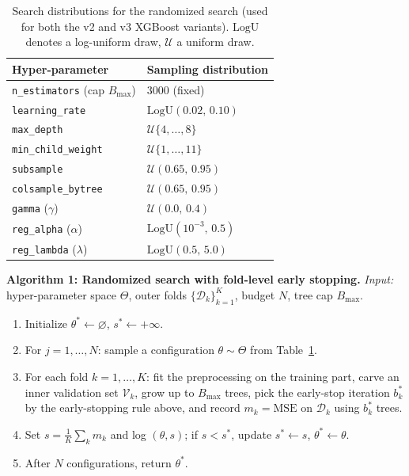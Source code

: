 \documentclass[journal]{IEEEtran}
\begin{document}
\begin{table}[!t]
\caption{Search distributions for the randomized search (used for both the v2
and v3 XGBoost variants). $\mathrm{LogU}$ denotes a log-uniform draw,
$\mathcal{U}$ a uniform draw.}
\label{tab:search}
\centering
\begin{tabular}{ll}
\toprule
Hyper-parameter & Sampling distribution \\
\midrule
\texttt{n\_estimators} (cap $B_{\max}$) & $3000$ (fixed) \\
\texttt{learning\_rate} & $\mathrm{LogU}(0.02,\,0.10)$ \\
\texttt{max\_depth} & $\mathcal{U}\{4,\dots,8\}$ \\
\texttt{min\_child\_weight} & $\mathcal{U}\{1,\dots,11\}$ \\
\texttt{subsample} & $\mathcal{U}(0.65,\,0.95)$ \\
\texttt{colsample\_bytree} & $\mathcal{U}(0.65,\,0.95)$ \\
\texttt{gamma} ($\gamma$) & $\mathcal{U}(0.0,\,0.4)$ \\
\texttt{reg\_alpha} ($\alpha$) & $\mathrm{LogU}(10^{-3},\,0.5)$ \\
\texttt{reg\_lambda} ($\lambda$) & $\mathrm{LogU}(0.5,\,5.0)$ \\
\bottomrule
\end{tabular}
\end{table}

\vspace{2pt}
\noindent\textbf{Algorithm 1: Randomized search with fold-level early stopping.}
\emph{Input:} hyper-parameter space $\Theta$, outer folds
$\{\mathcal{D}_k\}_{k=1}^{K}$, budget $N$, tree cap $B_{\max}$.
\begin{enumerate}
\item Initialize $\theta^{*}\leftarrow\varnothing$, $s^{*}\leftarrow+\infty$.
\item For $j=1,\dots,N$: sample a configuration $\theta\sim\Theta$ from
Table~\ref{tab:search}.
\item For each fold $k=1,\dots,K$: fit the preprocessing on the training part,
carve an inner validation set $\mathcal{V}_k$, grow up to $B_{\max}$ trees, pick
the early-stop iteration $b_k^{*}$ by the early-stopping rule above, and record
$m_k=\mathrm{MSE}$ on $\mathcal{D}_k$ using $b_k^{*}$ trees.
\item Set $s=\frac{1}{K}\sum_k m_k$ and log $(\theta,s)$; if $s<s^{*}$, update
$s^{*}\leftarrow s$, $\theta^{*}\leftarrow\theta$.
\item After $N$ configurations, return $\theta^{*}$.
\end{enumerate}
\vspace{2pt}
\end{document}

